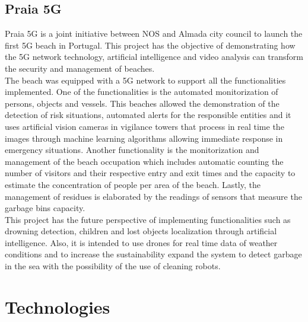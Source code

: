 \subsection{Praia 5G}
Praia 5G is a joint initiative between NOS and Almada city council to launch the first 5G beach in Portugal. This project has the objective of demonstrating how the 5G network technology, artificial intelligence and video analysis can transform the security and management of beaches\citep{praia5g1}.
\\
\indent The beach was equipped with a 5G network to support all the functionalities implemented. One of the functionalities is the automated monitorization of persons, objects and vessels. This beaches allowed the demonstration of the detection of risk situations, automated alerts for the responsible entities and it uses artificial vision cameras in vigilance towers that process in real time the images through machine learning algorithms allowing immediate response in emergency situations\citep{praia5g1}. Another functionality is the monitorization and management of the beach occupation which includes automatic counting the number of visitors and their respective entry and exit times and the capacity to estimate the concentration of people per area of the beach\citep{praia5g1,praia5g2}. Lastly, the management of residues is elaborated by the readings of sensors that measure the garbage bins capacity\citep{praia5g2}.
\\
\indent This project has the future perspective of implementing functionalities such as drowning detection, children and lost objects localization through artificial intelligence. Also, it is intended to use drones for real time data of weather conditions and to increase the sustainability expand the system to detect garbage in the sea with the possibility of the use of cleaning robots\citep{praia5g2}.


\section{Technologies}

